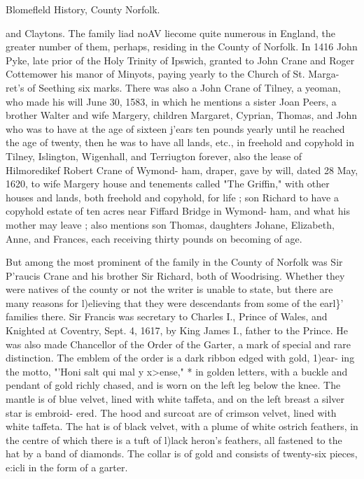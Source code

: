 \documentclass[oneside]{book}
\begin{document}
Blomefleld History, County Norfolk. 



and Claytons. The family liad noAV liecome quite numerous in 
England, the greater number of them, perhaps, residing in the 
County of Norfolk. In 1416 John Pyke, late prior of the Holy 
Trinity of Ipswich, granted to John Crane and Roger Cottemower 
his manor of Minyots, paying yearly to the Church of St. Marga- 
ret's of Seething six marks. There was also a John Crane of 
Tilney, a yeoman, who made his will June 30, 1583, in which he 
mentions a sister Joan Peers, a brother Walter and wife Margery, 
children Margaret, Cyprian, Thomas, and John who was to have 
at the age of sixteen j'ears ten pounds yearly until he reached 
the age of twenty, then he was to have all lands, etc., in freehold 
and copyhold in Tilney, Islington, Wigenhall, and Terriugton 
forever, also the lease of Hilmoredikef Robert Crane of Wymond- 
ham, draper, gave by will, dated 28 May, 1620, to wife Margery 
house and tenements called "The Griffin," with other houses and 
lands, both freehold and copyhold, for life ; son Richard to have 
a copyhold estate of ten acres near Fiffard Bridge in Wymond- 
ham, and what his mother may leave ; also mentions son Thomas, 
daughters Johane, Elizabeth, Anne, and Frances, each receiving 
thirty pounds on becoming of age. 

But among the most prominent of the family in the County of 
Norfolk was Sir P'raucis Crane and his brother Sir Richard, both 
of Woodrising. Whether they were natives of the county or not 
the writer is unable to state, but there are many reasons for 
l)elieving that they were descendants from some of the earl\}' 
families there. Sir Francis was secretary to Charles I., Prince 
of Wales, and Knighted at Coventry, Sept. 4, 1617, by King 
James I., father to the Prince. He was also made Chancellor of 
the Order of the Garter, a mark of special and rare distinction. 
The emblem of the order is a dark ribbon edged with gold, 1)ear- 
ing the motto, "'Honi salt qui mal y x>ense," * in golden letters, 
with a buckle and pendant of gold richly chased, and is worn on 
the left leg below the knee. The mantle is of blue velvet, lined 
with white taffeta, and on the left breast a silver star is embroid- 
ered. The hood and surcoat are of crimson velvet, lined with 
white taffeta. The hat is of black velvet, with a plume of white 
ostrich feathers, in the centre of which there is a tuft of l)lack 
heron's feathers, all fastened to the hat by a band of diamonds. 
The collar is of gold and consists of twenty-six pieces, e:icli in 
the form of a garter. 
\end{document}
